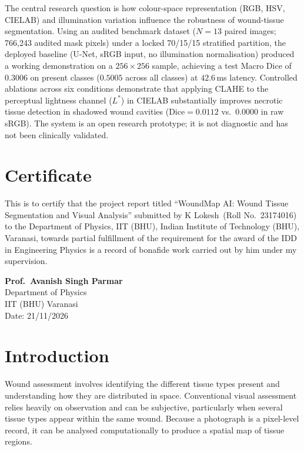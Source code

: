 \documentclass[12pt,a4paper]{article}
\newcommand{\ProjTitle}{WoundMap AI}
\newcommand{\StudentName}{K Lokesh}
\newcommand{\RollNo}{23174016}
\newcommand{\Supervisor}{Prof.\ Avanish Singh Parmar}
\newcommand{\Dept}{Department of Physics, IIT (BHU)}
\newcommand{\SubmitDate}{21/11/2026}
\begin{document}
The central research question is how colour-space representation (RGB, HSV, CIELAB) and illumination variation influence the robustness of wound-tissue segmentation. Using an audited benchmark dataset ($N=13$ paired images; 766,243 audited mask pixels) under a locked 70/15/15 stratified partition, the deployed baseline (U-Net, sRGB input, no illumination normalisation) produced a working demonstration on a $256\times256$ sample, achieving a test Macro Dice of $0.3006$ on present classes ($0.5005$ across all classes) at $42.6$\,ms latency. Controlled ablations across six conditions demonstrate that applying CLAHE to the perceptual lightness channel ($L^*$) in CIELAB substantially improves necrotic tissue detection in shadowed wound cavities ($\text{Dice}=0.0112$ vs.\ $0.0000$ in raw sRGB). The system is an open research prototype; it is not diagnostic and has not been clinically validated.

\newpage
\section*{Certificate}
This is to certify that the project report titled ``\ProjTitle: Wound Tissue Segmentation and Visual Analysis'' submitted by \StudentName\ (Roll No.\ \RollNo) to the \Dept, Indian Institute of Technology (BHU), Varanasi, towards partial fulfillment of the requirement for the award of the IDD in Engineering Physics is a record of bonafide work carried out by him under my supervision.

\vspace{2.5cm}
\noindent\textbf{\Supervisor}\\
Department of Physics\\
IIT (BHU) Varanasi\\
Date: \SubmitDate
\newpage

\tableofcontents
\newpage

\section{Introduction}
Wound assessment involves identifying the different tissue types present and understanding how they are distributed in space. Conventional visual assessment relies heavily on observation and can be subjective, particularly when several tissue types appear within the same wound. Because a photograph is a pixel-level record, it can be analysed computationally to produce a spatial map of tissue regions.
\end{document}
